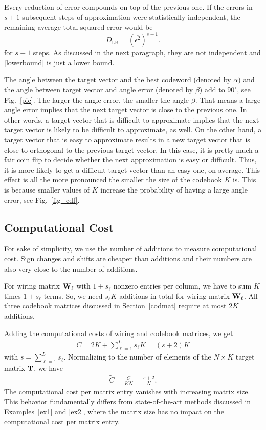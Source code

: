 \documentclass[twocolumn]{IEEEtran}
\begin{document}
Every reduction of error compounds on top of the previous one. If the errors in $s+1$ subsequent steps of approximation were statistically independent, the remaining average total squared error would be 
\begin{equation}
\label{lowerbound}
D_{\text{LB}} = 
\left(\overline{\epsilon^2}\right)^{s+1}.
\end{equation}
for $s+1$ steps. As discussed in the next paragraph, they are not independent and \eqref{lowerbound} is just a lower bound.

The angle between the target vector and the best codeword (denoted by $\alpha$) and the angle between target vector and angle error (denoted by $\beta$) add to $90^\circ$, see Fig.~\ref{pic}.
The larger the angle error, the smaller the angle $\beta$. That means a large angle error implies that the next target vector is close to the previous one. In other words, a target vector that is difficult to approximate implies that the next target vector is likely to be difficult to approximate, as well. On the other hand, a target vector that is easy to approximate results in a new target vector that is close to orthogonal to the previous target vector. In this case, it is pretty much a fair coin flip to decide whether the next approximation is easy or difficult. Thus, it is more likely to get a difficult target vector than an easy one, on average.
This effect is all the more pronounced the smaller the size of the codebook $K$ is. This is because smaller values of $K$ increase the probability of having a large angle error, see Fig.~\ref{fig_cdf}.

\subsection{Computational Cost}
\label{comcos}

For sake of simplicity, we use the number of additions to measure computational cost. Sign changes and shifts are cheaper than additions and their numbers are also very close to the number of additions.

For wiring matrix $\mathbf{W}_\ell$ with $1+s_\ell$ nonzero entries per column, we have to sum $K$ times $1+s_\ell$ terms. So, we need $s_\ell K$ additions in total for wiring matrix $\mathbf{W}_\ell$. 
All three codebook matrices discussed in Section~\ref{codmat} require at most $2K$ additions.

Adding the computational costs of wiring and codebook matrices, we get
\begin{align}
C = 2K +\sum\limits_{\ell=1}^L s_\ell K = (s+2) K
\end{align}
with $s=\sum_{\ell=1}^L s_\ell$. Normalizing to the number of elements of the $N\times K$ target matrix $\mathbf{T}$, we have
\begin{align}
\tilde C = \frac{C}{KN} = \frac{s+2}N.
\end{align}
The computational cost per matrix entry vanishes with increasing matrix size.
This behavior fundamentally differs from state-of-the-art methods discussed in Examples~\ref{ex1} and \ref{ex2}, where the matrix size has no impact on the computational cost per matrix entry.   
\end{document}
